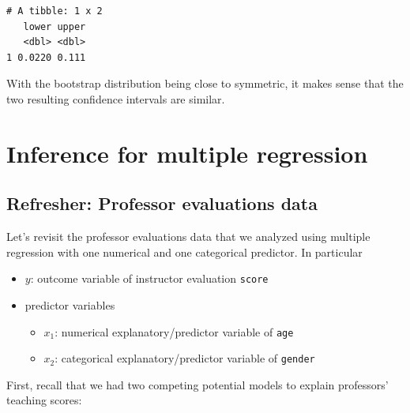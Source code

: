 \documentclass[12pt,]{krantz}
\makeatletter
\newenvironment{Shaded}{\begin{snugshade}}{\end{snugshade}}
\newcommand{\KeywordTok}[1]{\textcolor[rgb]{0.27,0.27,0.27}{\textbf{#1}}}
\newcommand{\StringTok}[1]{\textcolor[rgb]{0.5,0.5,0.5}{#1}}
\newcommand{\OperatorTok}[1]{\textcolor[rgb]{0.43,0.43,0.43}{\textbf{#1}}}
\newcommand{\NormalTok}[1]{#1}
\providecommand{\tightlist}{%
  \setlength{\itemsep}{0pt}\setlength{\parskip}{0pt}}
\newenvironment{kframe}{%
\medskip{}
\setlength{\fboxsep}{.8em}
 \def\at@end@of@kframe{}%
 \ifinner\ifhmode%
  \def\at@end@of@kframe{\end{minipage}}%
  \begin{minipage}{\columnwidth}%
 \fi\fi%
 \def\FrameCommand##1{\hskip\@totalleftmargin \hskip-\fboxsep
 \colorbox{shadecolor}{##1}\hskip-\fboxsep
     \hskip-\linewidth \hskip-\@totalleftmargin \hskip\columnwidth}%
 \MakeFramed {\advance\hsize-\width
   \@totalleftmargin\z@ \linewidth\hsize
   \@setminipage}}%
 {\par\unskip\endMakeFramed%
 \at@end@of@kframe}
\renewenvironment{Shaded}{\begin{kframe}}{\end{kframe}}
\theoremstyle{definition}
\theoremstyle{definition}
\theoremstyle{definition}
\theoremstyle{remark}
\makeatother
\begin{document}
\begin{verbatim}
# A tibble: 1 x 2
   lower upper
   <dbl> <dbl>
1 0.0220 0.111
\end{verbatim}

With the bootstrap distribution being close to symmetric, it makes sense
that the two resulting confidence intervals are similar.

\section{Inference for multiple
regression}\label{inference-for-multiple-regression}

\subsection{Refresher: Professor evaluations
data}\label{refresher-professor-evaluations-data}

Let's revisit the professor evaluations data that we analyzed using
multiple regression with one numerical and one categorical predictor. In
particular

\begin{itemize}
\tightlist
\item
  \(y\): outcome variable of instructor evaluation \texttt{score}
\item
  predictor variables

  \begin{itemize}
  \tightlist
  \item
    \(x_1\): numerical explanatory/predictor variable of \texttt{age}
  \item
    \(x_2\): categorical explanatory/predictor variable of
    \texttt{gender}
  \end{itemize}
\end{itemize}

\begin{Shaded}
\end{Shaded}

First, recall that we had two competing potential models to explain
professors' teaching scores:
\end{document}
